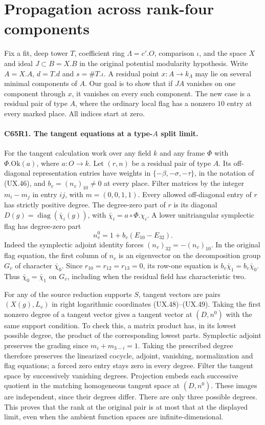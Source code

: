 \section{Propagation across rank-four components}

Fix a fit, deep tower $T$, coefficient ring $\Lambda=c'.O$, comparison
$\iota$, and the space $X$ and ideal $J\subset B=X.B$ in the original
potential modularity hypothesis. Write $A=X.A$, $d=T.d$ and
$s=\#T.\iota$. A residual point $x:A\to k_\Lambda$ may lie on several
minimal components of $A$. Our goal is to show that if $JA$ vanishes on
one component through $x$, it vanishes on every such component. The
new case is a residual pair of type $A$, where the ordinary local flag
has a nonzero $10$ entry at every marked place. All indices start at zero.

\paragraph{C65R1. The tangent equations at a type-$A$ split limit.}
For the tangent calculation work over any field $k$ and any frame
$\Phi$ with $\Phi.\mathrm{Ok}(a)$, where $a:O\to k$. Let $(r,n)$
be a residual pair of type $A$. Its off-diagonal representation
entries have weights in $\{-\beta,-\sigma,-\tau\}$, in the notation
of (UX.46), and $b_v=(n_v)_{10}\ne 0$ at every place.
Filter matrices by the integer $m_i-m_j$ in entry $ij$, with
$m=(0,0,1,1)$. Every allowed off-diagonal entry of $r$ has strictly
positive degree. The degree-zero part of $r$ is its diagonal
$D(g)=\operatorname{diag}(\bar\chi_i(g))$, with
$\bar\chi_i=a\circ\Phi.\chi_i$. A lower unitriangular symplectic
flag has degree-zero part
\[
       n_v^0=1+b_v(E_{10}-E_{32}).
\]
Indeed the symplectic adjoint identity forces $(n_v)_{32}=-(n_v)_{10}$.
In the original flag equation, the first column of $n_v$ is an
eigenvector on the decomposition group $G_v$ of character
$\bar\chi_0$. Since $r_{10}=r_{12}=r_{13}=0$, its row-one equation
is $b_v\bar\chi_1=b_v\bar\chi_0$. Thus $\bar\chi_0=\bar\chi_1$ on
$G_v$, including when the residual field has characteristic two.

For any of the source reduction supports $S$, tangent vectors are
pairs $(X(g),L_v)$ in right logarithmic coordinates (UX.48)--(UX.49).
Taking the first nonzero degree of a tangent vector gives a tangent
vector at $(D,n^0)$ with the same support condition. To check this,
a matrix product has, in its lowest possible degree, the product of
the corresponding lowest parts. Symplectic adjoint preserves the
grading since $m_i+m_{3-i}=1$. Taking the prescribed degree therefore
preserves the linearized cocycle, adjoint, vanishing, normalization
and flag equations; a forced zero entry stays zero in every degree.
Filter the tangent space by successively vanishing degrees. Projection
embeds each successive quotient in the matching homogeneous tangent
space at $(D,n^0)$. These images are independent, since their degrees
differ. There are only three possible degrees. This proves that the
rank at the original pair is at most that at the displayed limit,
even when the ambient function spaces are infinite-dimensional.

